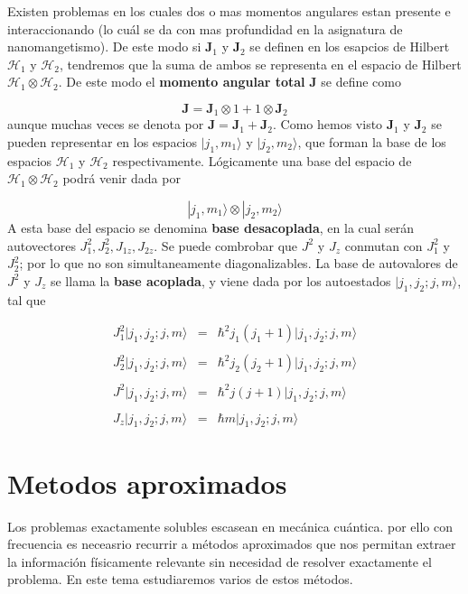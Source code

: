 \documentclass[12pt]{book}
\numberwithin{equation}{chapter}
\numberwithin{figure}{chapter}
\newcommand{\Hcal}{\mathcal{H}}
\newcommand{\Jn}{\mathbf{J}}
\begin{document}
Existen problemas en los cuales dos o mas momentos angulares estan presente e interaccionando (lo cuál se da con mas profundidad en la asignatura de nanomangetismo). De este modo si $\Jn_1$ y $\Jn_2$ se definen en los esapcios de Hilbert $\Hcal_1$ y $\Hcal_2$, tendremos que la suma de ambos se representa en el espacio de Hilbert $\Hcal_1 \otimes \Hcal_2$. De este modo el \textbf{momento angular total} $\Jn$ se define como 

\begin{equation}
\Jn = \Jn_1 \otimes 1 + 1 \otimes \Jn_2
\end{equation}
aunque muchas veces se denota por $\Jn=\Jn_1+\Jn_2$. Como hemos visto $\Jn_1$ y $\Jn_2$ se pueden representar en los espacios $|j_1,m_1\rangle$ y $|j_2,m_2\rangle$, que forman la base de los espacios $\Hcal_1$ y $\Hcal_2$ respectivamente. Lógicamente una base del espacio de $\Hcal_1 \otimes \Hcal_2$ podrá venir dada por

\begin{equation}
|j_1 ,m_1\rangle \otimes |j_2,m_2 \rangle
\end{equation}
A esta base del espacio se denomina \textbf{base desacoplada}, en la cual serán autovectores $J_1^2,J_2^2,J_{1z},J_{2z}$. Se puede combrobar que $J^2$ y $J_z$ conmutan con $J_1^2$ y $J_2^2$; por lo que no son simultaneamente diagonalizables. La base de autovalores de $J^2$ y $J_z$ se llama la \textbf{base acoplada}, y viene dada por los autoestados $|j_1,j_2;j,m\rangle$, tal que

\begin{equation}
\begin{array}{lll}
J_1^2 |j_1,j_2;j,m\rangle & = & \hbar^2 j_1(j_1+1)|j_1,j_2;j,m\rangle \\ \\
J_2^2 |j_1,j_2;j,m\rangle & = & \hbar^2 j_2(j_2+1)|j_1,j_2;j,m\rangle \\ \\
J^2 |j_1,j_2;j,m\rangle& = & \hbar^2 j(j+1) |j_1,j_2;j,m\rangle \\ \\
J_z |j_1,j_2;j,m\rangle & = & \hbar m |j_1,j_2;j,m\rangle 
\end{array}
\end{equation} 

\chapter{Metodos aproximados}

Los problemas exactamente solubles escasean en mecánica cuántica. por ello con frecuencia es neceasrio recurrir a métodos aproximados que nos permitan extraer la información físicamente relevante sin necesidad de resolver exactamente el problema. En este tema estudiaremos varios de estos métodos.  \\
\end{document}
